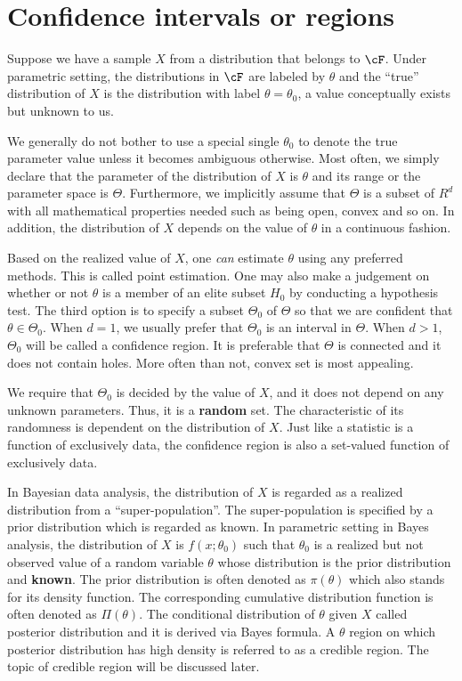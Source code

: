 \chapter{ Confidence intervals or regions}

Suppose we have a sample $X$ from a distribution that belongs to $\cF$.
Under parametric setting, the distributions in $\cF$ are labeled by $\theta$ and
the ``true'' distribution of $X$ is the distribution with label $\theta = \theta_0$, a value
conceptually exists but unknown to us.

We generally do not bother to use a special single $\theta_0$ to denote the true 
parameter value unless it becomes ambiguous otherwise. 
Most often, we simply declare that the parameter of the distribution of $X$ is
$\theta$ and its range or the parameter space is $\Theta$. Furthermore,
we implicitly assume that $\Theta$ is a subset of $R^d$ with all mathematical
properties needed such as being open, convex and so on.
In addition, the distribution of $X$ depends on the value of $\theta$ in a
continuous fashion.

Based on the realized value of $X$, one {\it can} estimate
$\theta$ using any preferred methods. This is called point estimation.
One may also make a judgement on whether or not $\theta$ is a member of
an elite subset $H_0$ by conducting a hypothesis test.
The third option is to specify a subset $\Theta_0$ of $\Theta$ so
that we are confident that $\theta \in \Theta_0$.
When $d = 1$, we usually prefer that $\Theta_0$ is an interval in
$\Theta$. When $d > 1$, $\Theta_0$ will be called a confidence region. 
It is preferable that $\Theta$ is connected and it does not contain holes. 
More often than not, convex set is most appealing.

We require that $\Theta_0$ is decided by the value of $X$, and
it does not depend on any unknown parameters. Thus, it is a {\bf random}
set. The characteristic of its randomness is dependent on the distribution of $X$.
Just like a statistic is a function of exclusively data,
the confidence region is also a set-valued function of exclusively data. 

In Bayesian data analysis, the distribution of $X$ is regarded as
a realized distribution from a ``super-population''. The super-population
is specified by a prior distribution which is regarded as known. 
In parametric setting in Bayes analysis, the distribution of $X$
is $f(x; \theta_0)$ such that $\theta_0$ is a realized but not observed value
of a random variable $\theta$ whose distribution is the prior distribution 
and {\bf known}.
The prior distribution is often denoted as $\pi(\theta)$ 
which also stands for its density function. The corresponding
cumulative distribution function is often denoted as $\Pi(\theta)$.
The conditional distribution of $\theta$ given $X$ called posterior distribution
and it is derived via Bayes formula.
A $\theta$ region on which posterior distribution has
high density is referred to as a credible region. 
The topic of credible region will be discussed later.

